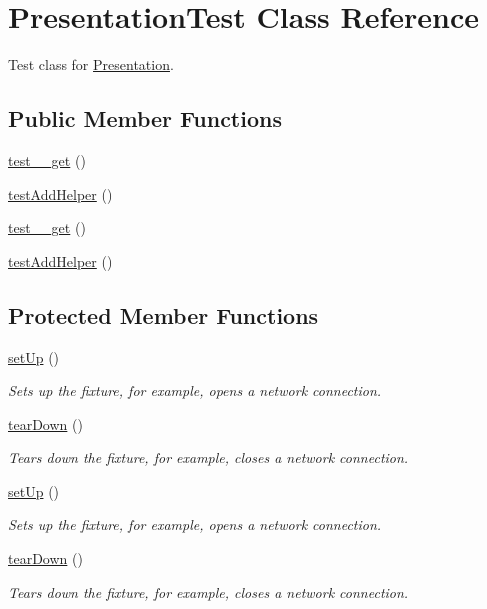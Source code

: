 \hypertarget{class_presentation_test}{
\section{PresentationTest Class Reference}
\label{class_presentation_test}
}


Test class for \hyperlink{class_presentation}{Presentation}.  


\subsection*{Public Member Functions}
\begin{DoxyCompactItemize}
\item 
\hyperlink{class_presentation_test_aeab1ab08718124b9d512c22c8a26279b}{test\_\-\_\-get} ()
\item 
\hyperlink{class_presentation_test_aeb75579ee620f3f00cbf349a0b6e8c7d}{testAddHelper} ()
\item 
\hyperlink{class_presentation_test_aeab1ab08718124b9d512c22c8a26279b}{test\_\-\_\-get} ()
\item 
\hyperlink{class_presentation_test_aeb75579ee620f3f00cbf349a0b6e8c7d}{testAddHelper} ()
\end{DoxyCompactItemize}
\subsection*{Protected Member Functions}
\begin{DoxyCompactItemize}
\item 
\hyperlink{class_presentation_test_a8e2af6888291c7c5f95e5a76a2ecae9f}{setUp} ()
\begin{DoxyCompactList}\small\item\em Sets up the fixture, for example, opens a network connection. \item\end{DoxyCompactList}\item 
\hyperlink{class_presentation_test_a5af403fd4e68c9a5b1b2d3e16e9e2487}{tearDown} ()
\begin{DoxyCompactList}\small\item\em Tears down the fixture, for example, closes a network connection. \item\end{DoxyCompactList}\item 
\hyperlink{class_presentation_test_a8e2af6888291c7c5f95e5a76a2ecae9f}{setUp} ()
\begin{DoxyCompactList}\small\item\em Sets up the fixture, for example, opens a network connection. \item\end{DoxyCompactList}\item 
\hyperlink{class_presentation_test_a5af403fd4e68c9a5b1b2d3e16e9e2487}{tearDown} ()
\begin{DoxyCompactList}\small\item\em Tears down the fixture, for example, closes a network connection. \item\end{DoxyCompactList}\end{DoxyCompactItemize}
